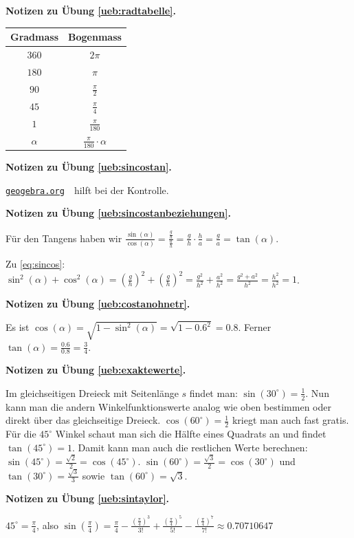 \documentclass[%
11pt,%
twoside,%
titlepage,%
swissgerman,%
headsepline%
]{scrartcl}
\newcommand{\faReturnGray}{\textcolor{gray}{\faMailReply}} %
\newcommand{\spaltenheight}{\rule{0mm}{3ex}}
\newcommand{\spaltensep}{\\[1ex]}
\newcommand{\geogebralink}{\href{https://www.geogebra.org/calculator}{\texttt{geogebra.org}}}
\theoremstyle{definition}
\theoremstyle{plain}
\newcommand{\concatueb}[1]{ueb:#1}%
\newcommand{\concatlsg}[1]{lsg:#1}%
\newenvironment{lsg}[1]{%
    \par\noindent\textbf{Notizen zu Übung \ref{\concatueb{#1}}.}%
    \label{\concatlsg{#1}} %
    \hfill\hyperref[\concatueb{#1}]{\faReturnGray}\par %
}{%
    \par%
}
\begin{document}
\begin{lsg}{radtabelle}
\begin{center}
\small
\begin{tabular}{|c|c|}
\hline
\rowcolor{Gray}\spaltenheight \textbf{Gradmass} & \textbf{Bogenmass}\spaltensep\hline
\rowcolor{lightyellow}\spaltenheight $360$ & $2\pi$\spaltensep\hline
\rowcolor{Gray}\spaltenheight $180$ & $\pi$\spaltensep\hline
\rowcolor{lightyellow}\spaltenheight $90$ & $\frac{\pi}{2}$\spaltensep\hline
\rowcolor{Gray}\spaltenheight $45$ & $\frac{\pi}{4}$\spaltensep\hline
\rowcolor{lightyellow}\spaltenheight $1$ & $\frac{\pi}{180}$\spaltensep\hline
\rowcolor{Gray}\spaltenheight $\alpha$ & $\frac{\pi}{180}\cdot\alpha$\spaltensep\hline
\end{tabular}
\end{center}
\end{lsg}
\begin{lsg}{sincostan}
\geogebralink\ \ hilft bei der Kontrolle.
\end{lsg}
\begin{lsg}{sincostanbeziehungen}
Für den Tangens haben wir $\frac{\sin(\alpha)}{\cos(\alpha)}=\frac{\frac{g}{h}}{\frac{a}{h}}=\frac{g}{h}\cdot\frac{h}{a}=\frac{g}{a}=\tan(\alpha)$.

Zu \eqref{eq:sincos}: $\sin^{2}(\alpha)+\cos^{2}(\alpha)=\left(\frac{g}{h}\right)^{2}+\left(\frac{g}{h}\right)^{2}=\frac{g^{2}}{h^{2}}+\frac{a^{2}}{h^{2}}=\frac{g^{2}+a^{2}}{h^{2}}=\frac{h^{2}}{h^{2}}=1$.
\end{lsg}
\begin{lsg}{costanohnetr}
Es ist $\cos(\alpha)=\sqrt{1-\sin^{2}(\alpha)}=\sqrt{1-0.6^{2}}=0.8$. Ferner $\tan(\alpha)=\frac{0.6}{0.8}=\frac{3}{4}$.
\end{lsg}
\begin{lsg}{exaktewerte}
Im gleichseitigen Dreieck mit Seitenl\"ange $s$ findet man: $\sin(30^{\circ})=\frac{1}{2}$. Nun kann man die andern Winkelfunktionswerte analog wie oben bestimmen oder direkt \"uber das gleichseitige Dreieck. $\cos(60^{\circ})=\frac{1}{2}$ kriegt man auch fast gratis. F\"ur die $45^{\circ}$ Winkel schaut man sich die H\"alfte eines Quadrats an und findet $\tan(45^{\circ})=1$. Damit kann man auch die restlichen Werte berechnen: $\sin(45^{\circ})=\frac{\sqrt{2}}{2}=\cos(45^{\circ})$. $\sin(60^{\circ})=\frac{\sqrt{3}}{2}=\cos(30^{\circ})$ und $\tan(30^{\circ})=\frac{\sqrt{3}}{3}$ sowie $\tan(60^{\circ})=\sqrt{3}$.
\end{lsg}
\begin{lsg}{sintaylor}
$45^{\circ}=\frac{\pi}{4}$, also $\sin(\frac{\pi}{4})=\frac{\pi}{4}-\frac{(\frac{\pi}{4})^{3}}{3!}+\frac{(\frac{\pi}{4})^{5}}{5!}-\frac{(\frac{\pi}{4})^{7}}{7!}\approx0.70710647$
\end{lsg}
\end{document}
